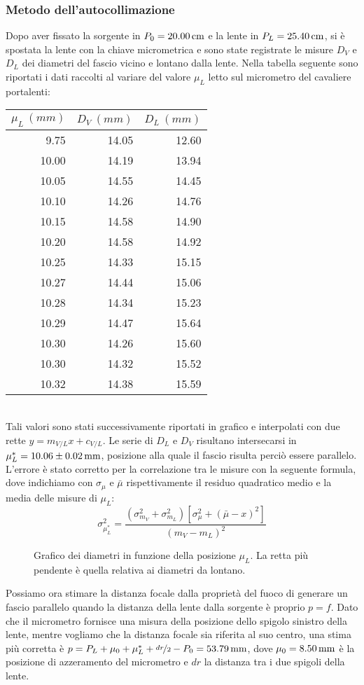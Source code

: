 \documentclass[italian,a4paper]{article}
\begin{document}
\subsubsection*{Metodo dell'autocollimazione}
Dopo aver fissato la sorgente in $P_0=\unit[20.00]{cm}$  e la lente in $P_L=\unit[25.40]{cm}$, si è spostata la lente con la chiave micrometrica e sono state registrate le misure $D_V$ e $D_L$ dei diametri del fascio vicino e lontano dalla lente. Nella tabella seguente sono riportati i dati raccolti al variare del valore $\mu_L$ letto sul micrometro del cavaliere portalenti:
\begin{table}[h!]
\centering
\begin{tabular}{*3r}
$\mu_L\:(\unit{mm})$& $D_V\:(\unit{mm})$& $D_L\:(\unit{mm})$\\\hline
9.75 &14.05 &12.60 \\
10.00 &14.19 &13.94 \\
10.05 &14.55 &14.45 \\
10.10 &14.26 &14.76 \\
10.15 &14.58 &14.90 \\
10.20 &14.58 &14.92 \\
10.25 &14.33 &15.15 \\
10.27 &14.44 &15.06 \\
10.28 &14.34 &15.23 \\
10.29 &14.47 &15.64 \\
10.30 &14.26 &15.60 \\
10.30 &14.32 &15.52 \\
10.32 &14.38 &15.59 \\
\end{tabular}
\end{table}\\
Tali valori sono stati successivamente riportati in grafico e interpolati con due rette $y = m_{V/L}x+ c_{V/L}$. Le serie di $D_L$ e $D_V$ risultano intersecarsi in $\mu^*_L=\unit[10.06 \pm 0.02]{mm}$, posizione alla quale il fascio risulta perciò essere parallelo. L'errore è stato corretto per la correlazione tra le misure con la seguente formula, dove indichiamo con $\sigma_\mu$ e $\bar\mu$ rispettivamente il residuo quadratico medio e la media delle misure di $\mu_L$:
\begin{equation*}
 \sigma_{\mu_L^*}^2 = \dfrac{(\sigma_{m_V}^2+\sigma_{m_L}^2)[\sigma_\mu^2+(\bar\mu-x)^2]}{(m_V-m_L)^2}
\end{equation*}

\begin{figure}[hp]
\centering
\caption{Grafico dei diametri in funzione della posizione $\mu_L$. La retta più pendente è quella relativa ai diametri da lontano.}\label{autocoll}
 
\end{figure}
Possiamo ora stimare la distanza focale dalla proprietà del fuoco di generare un fascio parallelo quando la distanza della lente dalla sorgente è proprio $p=f$.
Dato che il micrometro fornisce una misura della posizione dello spigolo sinistro della lente, mentre vogliamo che la distanza focale sia riferita al suo centro, una stima più corretta è $p=P_L+\mu_0+\mu_L^*+\nicefrac{dr}{2}-P_0 = \unit[53.79]{mm}$, dove $\mu_0=\unit[8.50]{mm}$ è la posizione di azzeramento del micrometro e $dr$ la distanza tra i due spigoli della lente.
\end{document}
